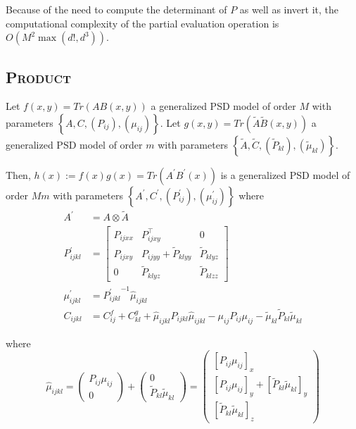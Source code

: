 \begin{remark}
Because of the need to compute the determinant of $P$ as well as invert it, the computational complexity of the partial evaluation operation is $O(M^2\max(d!, d^3))$.
\end{remark}
\subsection{\textsc{Product}}
\begin{proposition}
   Let $f(x, y) = Tr(AB(x, y))$ a generalized PSD model of order $M$ with parameters $\left\lbrace A, C, (P_{ij}), (\mu_{ij})\right\rbrace$.
   Let $g(x, y) = Tr(\tilde A \tilde B(x, y))$ a generalized PSD model of order $m$ with parameters $\left\lbrace \tilde A, \tilde C, (\tilde P_{kl}), (\tilde\mu_{kl})\right\rbrace$.

   Then, $h(x):=f(x)g(x)= Tr(A^\prime B^\prime(x))$ is a generalized PSD model of order $Mm$ with parameters $\left\lbrace A^\prime, C^\prime, (P^\prime_{ij}), (\mu^\prime_{ij})\right\rbrace$ where
    \begin{align}
    A^\prime &= A \otimes \tilde A\\
    P_{ijkl}^\prime &= \left[\begin{array}{ccc}
    P_{ijxx} & P_{ijxy}^\top  & 0 \\
    P_{ijxy} &P_{ijyy} + \tilde P_{klyy}  & \tilde P_{klyz} \\
    0 & \tilde P_{klyz} & \tilde P_{klzz}
    \end{array}\right]\\
    \mu^\prime_{ijkl} &= {P^\prime_{ijkl}}^{-1}\hat\mu_{ijkl}\\
    C_{ijkl} &= C^f_{ij} + C^g_{kl} +\hat\mu_{ijkl}P_{ijkl}\hat\mu_{ijkl} - \mu_{ij}P_{ij}\mu_{ij} - \tilde\mu_{kl}\tilde P_{kl}\tilde\mu_{kl}
\end{align}

where \begin{equation}
    \hat\mu_{ijkl} =\begin{pmatrix}
    {P_{ij}}\mu_{ij}\\
    0\end{pmatrix} +
    \begin{pmatrix}
     0 \\
    {\tilde P_{kl}}\tilde\mu_{kl}
    \end{pmatrix} =
    \begin{pmatrix}
    [{P_{ij}}\mu_{ij}]_x\\
    [{P_{ij}}\mu_{ij}]_{y} + [{\tilde P_{kl}}\tilde\mu_{kl}]_{y}\\
    [{\tilde P_{kl}}\tilde\mu_{kl}]_{z}
     \end{pmatrix}
     \end{equation}
\end{proposition}

